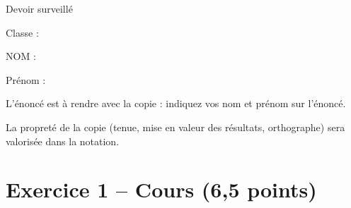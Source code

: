 
\usepackage{setspace}



\begin{header}
Devoir surveillé
\normalsize
\flushleft
\begin{doublespace}
Classe :

NOM :

\end{doublespace}
Prénom :
\end{header}
L'énoncé est à rendre avec la copie : indiquez vos nom et prénom sur l'énoncé.

\noindent
La propreté de la copie (tenue, mise en valeur des résultats, orthographe) sera valorisée dans la notation.

\section*{Exercice 1 -- Cours (6,5 points)}

